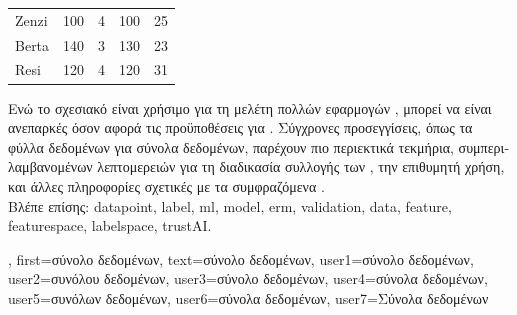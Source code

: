 {{\begin{table}[H]
\begin{tabular}{lcccc}
				\hline
				Zenzi & 100 & 4 & 100 & 25 \\
				Berta & 140 & 3 & 130 & 23 \\
				Resi  & 120 & 4 & 120 & 31 \\
				\hline
			\end{tabular}
		\end{table}
 		\foreignlanguage{greek}{Ενώ το σχεσιακό}  \foreignlanguage{greek}{είναι χρήσιμο για τη μελέτη πολλών εφαρμογών} , 
		\foreignlanguage{greek}{μπορεί να είναι ανεπαρκές όσον αφορά τις προϋποθέσεις για} . \foreignlanguage{greek}{Σύγχρονες  
 		προσεγγίσεις, όπως τα φύλλα δεδομένων για σύνολα δεδομένων, παρέχουν πιο περιεκτικά τεκμήρια, συμπεριλαμβανομένων λεπτομερειών 
		για τη διαδικασία συλλογής των} , \foreignlanguage{greek}{την επιθυμητή χρήση, και άλλες πληροφορίες σχετικές με τα συμφραζόμενα} 
 		\cite{DatasheetData2021}.\\
 		\foreignlanguage{greek}{Βλέπε επίσης:} \gls{datapoint}, \gls{label}, \gls{ml}, \gls{model}, \gls{erm}, \gls{validation}, \gls{data}, \gls{feature}, \gls{featurespace}, 
		\gls{labelspace}, \gls{trustAI}.},
 	first={\foreignlanguage{greek}{σύνολο δεδομένων}},
 	text={\foreignlanguage{greek}{σύνολο δεδομένων}},
 	user1={\foreignlanguage{greek}{σύνολο δεδομένων}}, %
 	user2={\foreignlanguage{greek}{συνόλου δεδομένων}}, %
 	user3={\foreignlanguage{greek}{σύνολο δεδομένων}}, %
 	user4={\foreignlanguage{greek}{σύνολα δεδομένων}}, %
	user5={\foreignlanguage{greek}{συνόλων δεδομένων}}, %
 	user6={\foreignlanguage{greek}{σύνολα δεδομένων}}, %
	user7={\foreignlanguage{greek}{Σύνολα δεδομένων}} %
}

